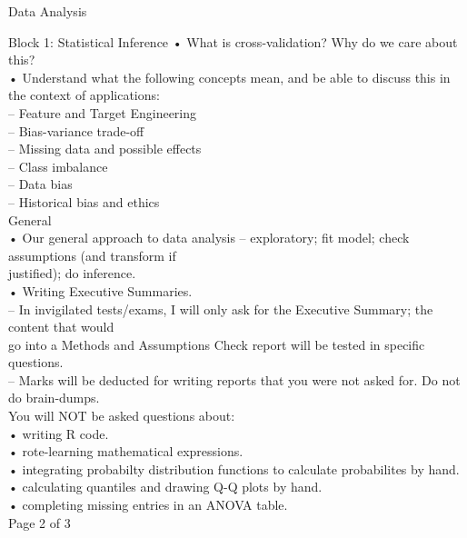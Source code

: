 \documentclass[
  ignorenonframetext,
]{beamer}
\begin{document}
\begin{frame}{Data Analysis}
\begin{block}{Block 1: Statistical Inference}
• What is cross-validation? Why do we care about this?\\
• Understand what the following concepts mean, and be able to discuss
this in the context of applications:\\
-- Feature and Target Engineering\\
-- Bias-variance trade-off\\
-- Missing data and possible effects\\
-- Class imbalance\\
-- Data bias\\
-- Historical bias and ethics\\
General\\
• Our general approach to data analysis -- exploratory; fit model; check
assumptions (and transform if\\
justified); do inference.\\
• Writing Executive Summaries.\\
-- In invigilated tests/exams, I will only ask for the Executive
Summary; the content that would\\
go into a Methods and Assumptions Check report will be tested in
specific questions.\\
-- Marks will be deducted for writing reports that you were not asked
for. Do not do brain-dumps.\\
You will NOT be asked questions about:\\
• writing R code.\\
• rote-learning mathematical expressions.\\
• integrating probabilty distribution functions to calculate
probabilites by hand.\\
• calculating quantiles and drawing Q-Q plots by hand.\\
• completing missing entries in an ANOVA table.\\
Page 2 of 3


\end{block}
\end{frame}
\end{document}
